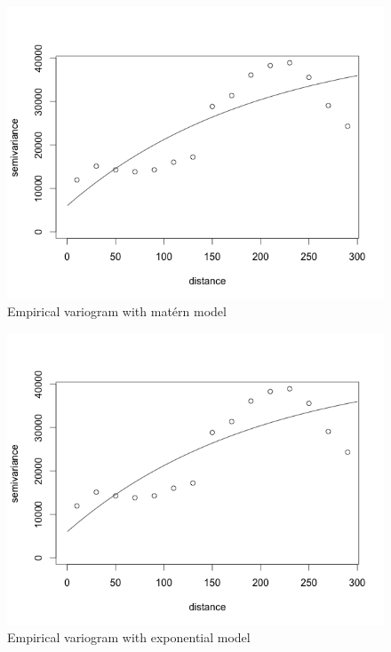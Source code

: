 \documentclass[12pt,twoside]{reedthesis}
\begin{document}
\begin{figure}[h]
	   
	       \centering
	  
	    \includegraphics[scale=0.5]{vario_matern}
	
	     \caption{Empirical variogram with mat\'ern model}
	 \label{matern}
	\end{figure}
	
\begin{figure}[h]
	   
	       \centering
	  
	    \includegraphics[scale=0.5]{vario_exp}
	
	     \caption{Empirical variogram with exponential model}
	 \label{exp}
	\end{figure}
	
\end{document}
